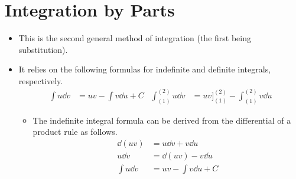 \documentclass[../main.tex]{subfiles}
\begin{document}
\section{Integration by Parts}
\begin{itemize}
    \item This is the second general method of integration (the first being substitution).
    \item It relies on the following formulas for indefinite and definite integrals, respectively.
    \begin{align*}
        \int u\dd{v} &= uv-\int v\dd{u}+C&
        \int_{(1)}^{(2)}u\dd{v} &= uv\Big]_{(1)}^{(2)}-\int_{(1)}^{(2)}v\dd{u}
    \end{align*}
    \begin{itemize}
        \item The indefinite integral formula can be derived from the differential of a product rule as follows.
        \begin{align*}
            \dd{(uv)} &= u\dd{v}+v\dd{u}\\
            u\dd{v} &= \dd{(uv)}-v\dd{u}\\
            \int u\dd{v} &= uv-\int v\dd{u}+C
        \end{align*}
        \begin{figure}[h!]
            \centering
\end{figure}
\end{itemize}
\end{itemize}
\end{document}

